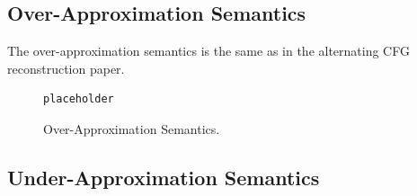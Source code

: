 \documentclass{kththesis}
\begin{document}
\subsection{Over-Approximation Semantics}

The over-approximation semantics is the same as in the alternating CFG reconstruction paper.

\begin{figure}[h]
    \centering
\begin{lstlisting}[style=frame]
placeholder
\end{lstlisting}
\caption[Over-Approximation Semantics.]{Over-Approximation Semantics.}
    \label{fig:overApproximationSemantics}
\end{figure}

\subsection{Under-Approximation Semantics}
\end{document}

